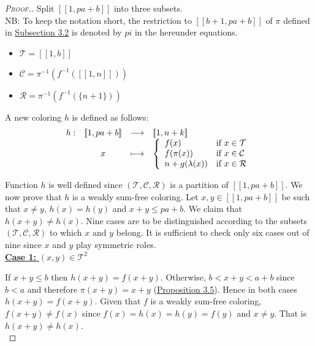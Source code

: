 \begin{proof}[\textsc{Proof.}]
Split \([\![1, p a + b]\!]\) into three subsets. \\
NB: To keep the notation short, the restriction to \([\![b + 1, p a + b]\!]\) of \(\pi\) defined in \hyperref[DefinitionWS+]{Subsection 3.2}
is denoted by \(pi\) in the hereunder equations.

\begin{itemize}
	\item \(\mathcal{T} = [\![1, b]\!]\)
	\item \(\mathcal{C} = \pi^{-1}(f^{-1}([\![1, n]\!]))\)
	\item \(\mathcal{R} = \pi^{-1}(f^{-1}(\{n + 1\}))\)
\end{itemize}

A new coloring \(h\) is defined as follows:
\[
\begin{array}{c c c l}
	h : & [\![1, p a + b]\!] & \longrightarrow & [\![1,n+k]\!] \\
	& x & \longmapsto &
	\left\{ \begin{array}{l l}
		f(x) & \text{if}~x \in \mathcal{T} \\
		f(\pi(x)) & \text{if}~x \in \mathcal{C} \\
		n + g(\lambda(x)) & \text{if}~x \in \mathcal{R}
	\end{array} \right.
\end{array}
\]

Function \(h\) is well defined since \((\mathcal{T}, \mathcal{C}, \mathcal{R})\) is a partition of  \([\![1, p a + b]\!]\).
We now prove that \(h\) is a weakly sum-free coloring. Let \(x,y \in [\![1, p a + b]\!]\) be such that \(x \neq y\),
\(h(x) = h(y)\) and \(x+y \leqslant p a+ b\). We claim that \(h(x+y) \neq h(x)\). Nine cases are to be distinguished
according to the subsets \((\mathcal{T}, \mathcal{C}, \mathcal{R})\) to which \(x\) and \(y\) belong. It is
sufficient to check only six cases out of nine since \(x\) and \(y\) play symmetric roles. \\

\noindent \underline{\textbf{Case 1:} \((x,y) \in \mathcal{T}^2\)}
\par
If \(x + y \leqslant b\) then \(h(x+y)=f(x+y)\). Otherwise, \(b < x+y < a+b\) since \(b < a\) and
therefore \(\pi(x + y) = x +y\) (\hyperref[prop1]{Proposition 3.5}). Hence in both cases \(h(x+y)=f(x+y)\). Given that
\(f\) is a weakly sum-free coloring, \(f(x + y) \neq f(x)\) since \(f(x)=h(x)=h(y)=f(y)\) and \(x \neq y \). That
is \(h(x + y) \neq h(x)\). \\


\end{proof}
